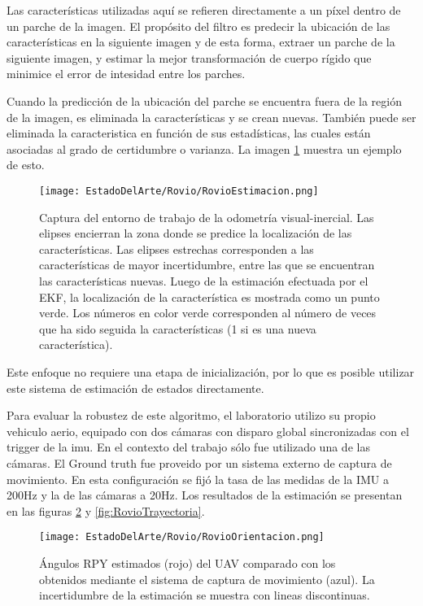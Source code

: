 Las características utilizadas aquí se refieren directamente a un píxel dentro de un parche de la imagen. El propósito del filtro es predecir la ubicación de las características en la siguiente imagen y de esta forma, extraer un parche de la siguiente imagen, y estimar la mejor transformación de cuerpo rígido que minimice el error de intesidad entre los parches. 

Cuando la predicción de la ubicación del parche se encuentra fuera de la región de la imagen, es eliminada la características y se crean nuevas. También puede ser eliminada la caracteristica en función de sus estadísticas, las cuales están asociadas al grado de certidumbre o varianza. La imagen \ref{fig:RovioEstimacion} muestra un ejemplo de esto.

\begin{figure}[H]
	\centering
	\texttt{[image: EstadoDelArte/Rovio/RovioEstimacion.png]}
	\caption{Captura del entorno de trabajo de la odometría visual-inercial. Las elipses encierran la zona donde se predice la localización de las características. Las elipses estrechas corresponden a las características de mayor incertidumbre, entre las que se encuentran las características nuevas. Luego de la estimación efectuada por el EKF, la localización de la característica es mostrada como un punto verde. Los números en color verde corresponden al número de veces que ha sido seguida la características (1 si es una nueva característica).}
	\label{fig:RovioEstimacion}
\end{figure}


Este enfoque no requiere una etapa de inicialización, por lo que es posible utilizar este sistema de estimación de estados directamente.


Para evaluar la robustez de este algoritmo, el laboratorio utilizo su propio vehiculo aerio, equipado con dos cámaras con disparo global sincronizadas con el trigger de la imu. En el contexto del trabajo sólo fue utilizado una de las cámaras. El Ground truth fue proveido por un sistema externo de captura de movimiento. En esta configuración se fijó la tasa de las medidas de la IMU a 200Hz y la de las cámaras a 20Hz. Los resultados de la estimación se presentan en las figuras \ref{fig:RovioOrientacion} y  \ref{fig:RovioTrayectoria}.

\begin{figure}[H]
	\centering
	\texttt{[image: EstadoDelArte/Rovio/RovioOrientacion.png]}
	\caption{Ángulos RPY estimados (rojo) del UAV comparado con los obtenidos mediante el sistema de captura de movimiento (azul). La incertidumbre de la estimación se muestra con lineas discontinuas. }
	\label{fig:RovioOrientacion}
\end{figure}


